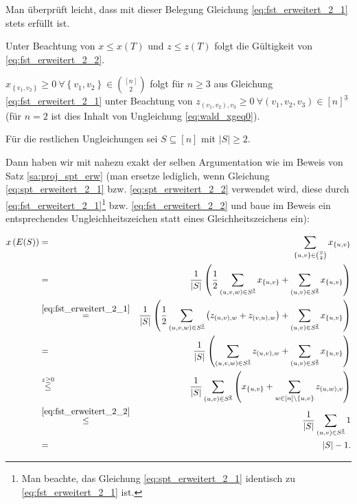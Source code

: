 \documentclass[10p,a4paper,BCOR = 12mm, DIV=15]{scrbook}
\begin{document}
{\begin{bew}
Man überprüft leicht, dass mit dieser Belegung Gleichung \eqref{eq:fst_erweitert_2_1} stets erfüllt ist.

Unter Beachtung von $x \leq x\left(T\right)$ und $z \leq z\left(T\right)$ folgt die Gültigkeit von \eqref{eq:fst_erweitert_2_2}.

$x_{\left\{v_1, v_2\right\}} \geq 0 \ \forall \left\{v_1, v_2\right\} \in {\left[n\right] \choose 2}$ folgt für $n \geq 3$ aus Gleichung \eqref{eq:fst_erweitert_2_1} unter Beachtung von $z_{\left(v_1, v_2\right), v_3} \geq 0 \ \forall \left(v_1, v_2, v_3\right) \in \left[n\right]^{\underline{3}}$ (für $n=2$ ist dies Inhalt von Ungleichung \eqref{eq:wald_xgeq0}).

Für die restlichen Ungleichungen sei $S \subseteq \left[n\right]$ mit $\left|S\right| \geq 2$.

Dann haben wir mit nahezu exakt der selben Argumentation wie im Beweis von Satz \ref{sa:proj_spt_erw} (man ersetze lediglich, wenn Gleichung \eqref{eq:spt_erweitert_2_1} bzw. \eqref{eq:spt_erweitert_2_2} verwendet wird, diese durch \eqref{eq:fst_erweitert_2_1}\footnote{Man beachte, das Gleichung \eqref{eq:spt_erweitert_2_1} identisch zu \eqref{eq:fst_erweitert_2_1} ist.} bzw. \eqref{eq:fst_erweitert_2_2} und baue im Beweis ein entsprechendes Ungleichheitszeichen statt eines Gleichheitszeichens ein):

{
\allowdisplaybreaks
\begin{eqnarray*}
x\left(E(S)\right) & = & \sum_{\left\{u, v\right\} \in {S \choose 2}} x_{\left\{u, v\right\}} \\
& = & \frac{1}{\left|S\right|} \left(\frac{1}{2} \sum_{\left(u, v, w\right) \in S^{\underline{3}}} x_{\left\{u, v\right\}} + \sum_{\left(u, v\right) \in S^{\underline{2}}} x_{\left\{u, v\right\}} \right) \\
& \stackrel{\eqref{eq:fst_erweitert_2_1}}{=} & \frac{1}{\left|S\right|} \left(\frac{1}{2} \sum_{\left(u, v, w\right) \in S^{\underline{3}}} \left(z_{\left(u, v\right), w} + z_{\left(v, u\right), w}\right) + \sum_{\left(u, v\right) \in S^{\underline{2}}} x_{\left\{u, v\right\}} \right) \\
& = & \frac{1}{\left|S\right|} \left(\sum_{\left(u, v, w\right) \in S^{\underline{3}}} z_{\left(u, v\right), w} + \sum_{\left(u, v\right) \in S^{\underline{2}}} x_{\left\{u, v\right\}} \right) \\
& \stackrel{z \geq 0}{\leq} & \frac{1}{\left|S\right|} \sum_{\left(u, v\right) \in S^{\underline{2}}} \left( x_{\left\{u, v\right\}} + \sum_{w \in \left[n\right] \backslash \left\{u, v\right\}} z_{\left(u, w\right), v} 
\right) \\
& \stackrel{\eqref{eq:fst_erweitert_2_2}}{\leq} & \frac{1}{\left|S\right|} \sum_{\left(u, v\right) \in S^{\underline{2}}} 1 \\
& = & \left|S\right|-1.
\end{eqnarray*}
}
\end{bew}

}
\end{document}
